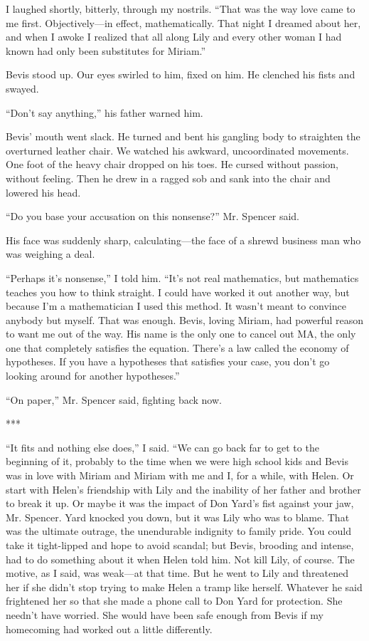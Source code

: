 \documentclass{novel}
\begin{document}
{I laughed shortly, bitterly, through my nostrils. “That was the way love came to me first. Objectively—in effect, mathematically. That night I dreamed about her, and when I awoke I realized that all along Lily and every other woman I had known had only been substitutes for Miriam.”

Bevis stood up. Our eyes swirled to him, fixed on him. He clenched his fists and swayed.

“Don’t say anything,” his father warned him.

Bevis’ mouth went slack. He turned and bent his gangling body to straighten the overturned leather chair. We watched his awkward, uncoordinated movements. One foot of the heavy chair dropped on his toes. He cursed without passion, without feeling. Then he drew in a ragged sob and sank into the chair and lowered his head.

“Do you base your accusation on this nonsense?” Mr. Spencer said.

His face was suddenly sharp, calculating—the face of a shrewd business man who was weighing a deal.

“Perhaps it’s nonsense,” I told him. “It’s not real mathematics, but mathematics teaches you how to think straight. I could have worked it out another way, but because I’m a mathematician I used this method. It wasn’t meant to convince anybody but myself. That was enough. Bevis, loving Miriam, had powerful reason to want me out of the way. His name is the only one to cancel out MA, the only one that completely satisfies the equation. There’s a law called the economy of hypotheses. If you have a hypotheses that satisfies your case, you don’t go looking around for another hypotheses.”

“On paper,” Mr. Spencer said, fighting back now.

***

“It fits and nothing else does,” I said. “We can go back far to get to the beginning of it, probably to the time when we were high school kids and Bevis was in love with Miriam and Miriam with me and I, for a while, with Helen. Or start with Helen’s friendship with Lily and the inability of her father and brother to break it up. Or maybe it was the impact of Don Yard’s fist against your jaw, Mr. Spencer. Yard knocked you down, but it was Lily who was to blame. That was the ultimate outrage, the unendurable indignity to family pride. You could take it tight-lipped and hope to avoid scandal; but Bevis, brooding and intense, had to do something about it when Helen told him. Not kill Lily, of course. The motive, as I said, was weak—at that time. But he went to Lily and threatened her if she didn’t stop trying to make Helen a tramp like herself. Whatever he said frightened her so that she made a phone call to Don Yard for protection. She needn’t have worried. She would have been safe enough from Bevis if my homecoming had worked out a little differently.

}
\end{document}
